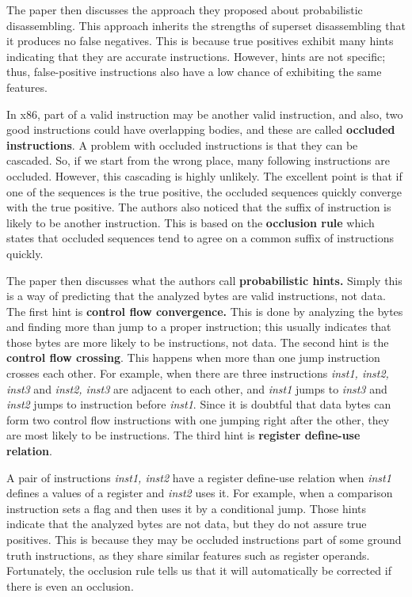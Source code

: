 \documentclass[conference,a4paper]{IEEEtran}
\begin{document}
The paper then discusses the approach they proposed about probabilistic disassembling. This approach inherits the strengths of superset disassembling that it produces no false negatives. This is because true positives exhibit many hints indicating that they are accurate instructions. However, hints are not specific; thus, false-positive instructions also have a low chance of exhibiting the same features.

In x86, part of a valid instruction may be another valid instruction, and also, two good instructions could have overlapping bodies, and these are called \textbf{occluded instructions}. A problem with occluded instructions is that they can be cascaded. So, if we start from the wrong place, many following instructions are occluded. However, this cascading is highly unlikely. The excellent point is that if one of the sequences is the true positive, the occluded sequences quickly converge with the true positive. The authors also noticed that the suffix of instruction is likely to be another instruction. This is based on the \textbf{occlusion rule} which states that occluded sequences tend to agree on a common suffix of instructions quickly.

The paper then discusses what the authors call \textbf{probabilistic hints.}
Simply this is a way of predicting that the analyzed bytes are valid instructions, not data.
The first hint is \textbf{control flow convergence.} This is done by analyzing the bytes and finding more than jump to a proper instruction; this usually indicates that those bytes are more likely to be instructions, not data. The second hint is the \textbf{control flow crossing}. This happens when more than one jump instruction crosses each other. For example, when there are three instructions \emph{inst1, inst2, inst3} and \emph{inst2, inst3} are adjacent to each other, and \emph{inst1} jumps to \emph{inst3} and \emph{inst2} jumps to instruction before \emph{inst1}. Since it is doubtful that data bytes can form two control flow instructions with one jumping right after the other, they are most likely to be instructions. The third hint is \textbf{register define-use relation}.

A pair of instructions \emph{inst1, inst2} have a register define-use relation when \emph{inst1} defines a values of a register and \emph{inst2} uses it.
For example, when a comparison instruction sets a flag and then uses it by a conditional jump.
Those hints indicate that the analyzed bytes are not data, but they do not assure true positives.
This is because they may be occluded instructions part of some ground truth instructions, as they share similar features such as register operands.
Fortunately, the occlusion rule tells us that it will automatically be corrected if there is even an occlusion.
\end{document}
